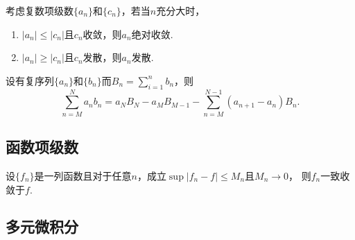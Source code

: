   \begin{thm}
    考虑复数项级数$\{a_n\}$和$\{c_n\}$，若当$n$充分大时，
    \begin{enumerate}
      \item $|a_n| \le |c_n|$且$c_n$收敛，则$a_n$绝对收敛.
      \item $|a_n| \ge |c_n|$且$c_n$发散，则$a_n$发散.
    \end{enumerate}
  \end{thm}

  \begin{thm}[分部求和]
    \label{thm: 分部求和}
    设有复序列$\{a_n\}$和$\{b_n\}$而$B_n=\sum_{i=1}^nb_n$，则
    \[
      \sum_{n=M}^N a_nb_n = a_NB_N - a_MB_{M-1} -
      \sum_{n=M}^{N-1}(a_{n+1}-a_n)B_n.
    \]
  \end{thm}

\subsection{函数项级数}

  \begin{thm}
    设$\{f_n\}$是一列函数且对于任意$n$，成立$\sup|f_n-f|\le M_n$且$M_n\to 0$，
    则$f_n$一致收敛于$f$.
  \end{thm}

\subsection{多元微积分}

